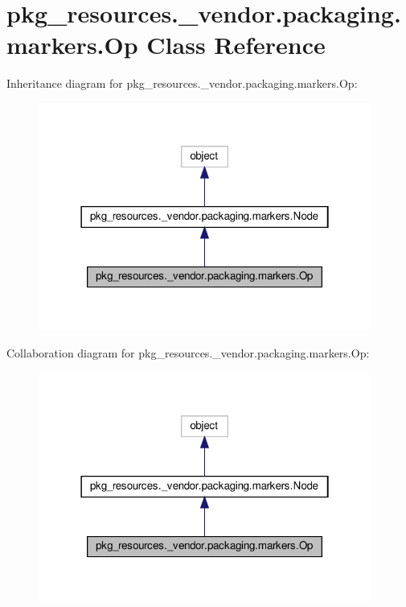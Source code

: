 \hypertarget{classpkg__resources_1_1__vendor_1_1packaging_1_1markers_1_1Op}{}\section{pkg\+\_\+resources.\+\_\+vendor.\+packaging.\+markers.\+Op Class Reference}
\label{classpkg__resources_1_1__vendor_1_1packaging_1_1markers_1_1Op}


Inheritance diagram for pkg\+\_\+resources.\+\_\+vendor.\+packaging.\+markers.\+Op\+:
\nopagebreak
\begin{figure}[H]
\begin{center}
\leavevmode
\includegraphics[width=310pt]{classpkg__resources_1_1__vendor_1_1packaging_1_1markers_1_1Op__inherit__graph}
\end{center}
\end{figure}


Collaboration diagram for pkg\+\_\+resources.\+\_\+vendor.\+packaging.\+markers.\+Op\+:
\nopagebreak
\begin{figure}[H]
\begin{center}
\leavevmode
\includegraphics[width=310pt]{classpkg__resources_1_1__vendor_1_1packaging_1_1markers_1_1Op__coll__graph}
\end{center}
\end{figure}
